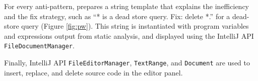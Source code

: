 For every anti-pattern, \Tool prepares a string template that explains the inefficiency and the fix strategy,
such as ``* is a dead store query. Fix: delete *.'' for a dead-store query (Figure \ref{fig:pw}). This string
is instantiated with program variables and expressions output from \Tool static analysis, and displayed using
the IntelliJ API {\tt FileDocumentManager}.

Finally, IntelliJ API {\tt FileEditorManager}, {\tt TextRange}, and {\tt Document} are used to insert, replace, and delete source code
in the editor panel. 


